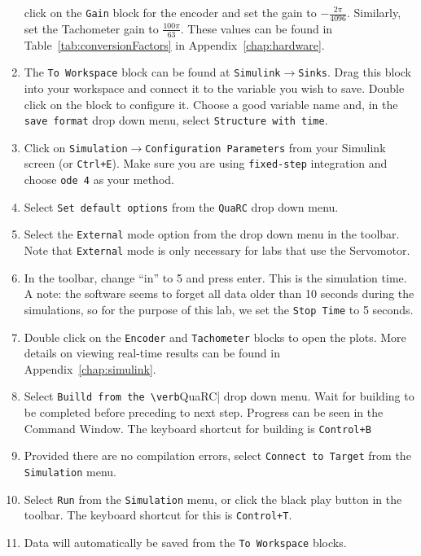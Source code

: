 \begin{enumerate}
          click on the \verb|Gain| block for the encoder and set the gain to \(-\frac{2\pi}{4096}\).
          Similarly, set the Tachometer gain to \(\frac{100\pi}{63}\). These values can be found in
          Table~\ref{tab:conversionFactors} in Appendix~\ref{chap:hardware}.
    \item The \verb|To Workspace| block can be found at
          \verb|Simulink|\(\to \)\verb|Sinks|.  Drag this block into your workspace and
          connect it to the variable you wish to save.  Double click on the block to
          configure it.  Choose a good variable name and, in the \verb|save format|
          drop down menu, select \verb|Structure with time|.
    \item Click on \verb|Simulation|\(\to \)\verb|Configuration Parameters| from
          your \textsf{Simulink} screen (or \verb|Ctrl+E|).  Make sure you are using
          \verb|fixed-step| integration and choose \verb|ode 4| as your method.
    \item Select \verb|Set default options| from the \verb|QuaRC| drop down menu.
    \item Select the \verb|External| mode option from the drop down menu in the toolbar.
          Note that \verb|External| mode is only necessary for labs that use the Servomotor.
    \item In the toolbar, change ``in'' to 5 and press enter. This is the simulation time. A note: the software seems to forget all data older than 10 seconds during the simulations, so for the purpose of this lab, we set the \verb|Stop Time| to 5 seconds.
    \item Double click on the \verb|Encoder| and \verb|Tachometer| blocks to open
          the plots.  More details on viewing real-time results can be found in
          Appendix~\ref{chap:simulink}\@.
    \item Select \verb|Builld from the \verb|QuaRC| drop down menu.  Wait for
          building to be completed before preceding to next step. Progress can be seen
          in the Command Window. The keyboard shortcut for building is \verb|Control+B|
    \item Provided there are no compilation errors, select
          \verb|Connect to Target| from the \verb|Simulation| menu.
    \item Select \verb|Run| from the \verb|Simulation| menu, or click
          the black play button in the toolbar. The keyboard shortcut for this is \verb|Control+T|.
    \item Data will automatically be saved from the \verb|To Workspace| blocks.

\end{enumerate}
